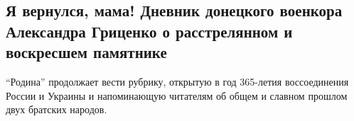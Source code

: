  
 
 
 
 

\subsection{Я вернулся, мама! Дневник донецкого военкора Александра Гриценко о расстрелянном и воскресшем памятнике}
\label{sec:11_08_2021.stz.news.ru.rg.1.dnevnik_pamjatnik}


\enquote{Родина} продолжает вести рубрику, открытую в год 365-летия воссоединения
России и Украины и напоминающую читателям об общем и славном прошлом двух
братских народов.

